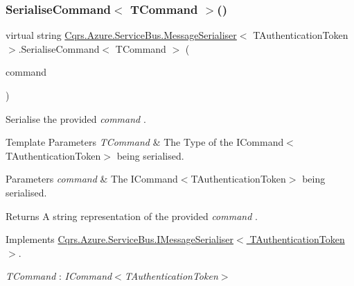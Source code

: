 \subsubsection{\texorpdfstring{Serialise\+Command$<$ T\+Command $>$()}{SerialiseCommand< TCommand >()}}
{\footnotesize\ttfamily virtual string \hyperlink{classCqrs_1_1Azure_1_1ServiceBus_1_1MessageSerialiser}{Cqrs.\+Azure.\+Service\+Bus.\+Message\+Serialiser}$<$ T\+Authentication\+Token $>$.Serialise\+Command$<$ T\+Command $>$ (\begin{DoxyParamCaption}\item[{T\+Command}]{command }\end{DoxyParamCaption})\hspace{0.3cm}{\ttfamily [virtual]}}



Serialise the provided {\itshape command} . 


\begin{DoxyTemplParams}{Template Parameters}
{\em T\+Command} & The Type of the I\+Command$<$\+T\+Authentication\+Token$>$ being serialised.\\
\hline
\end{DoxyTemplParams}

\begin{DoxyParams}{Parameters}
{\em command} & The I\+Command$<$\+T\+Authentication\+Token$>$ being serialised.\\
\hline
\end{DoxyParams}
\begin{DoxyReturn}{Returns}
A string representation of the provided {\itshape command} .
\end{DoxyReturn}


Implements \hyperlink{interfaceCqrs_1_1Azure_1_1ServiceBus_1_1IMessageSerialiser_a7454ac36eca3dd37d0c596e0406b4c81_a7454ac36eca3dd37d0c596e0406b4c81}{Cqrs.\+Azure.\+Service\+Bus.\+I\+Message\+Serialiser$<$ T\+Authentication\+Token $>$}.

\begin{Desc}
\item[Type Constraints]\begin{description}
\item[{\em T\+Command} : {\em I\+Command$<$T\+Authentication\+Token$>$}]\end{description}
\end{Desc}
\mbox{\label{classCqrs_1_1Azure_1_1ServiceBus_1_1MessageSerialiser_a5650683271dec423489b016da15d8d3d_a5650683271dec423489b016da15d8d3d}} 
